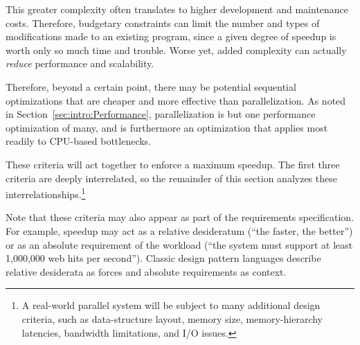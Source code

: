 \begin{description}
	This greater complexity often translates
	to higher development and maintenance costs.
	Therefore, budgetary constraints can
	limit the number and types of modifications made to
	an existing program, since a given degree of speedup is
	worth only so much time and trouble.
	Worse yet, added complexity can actually \emph{reduce}
	performance and scalability.

	Therefore, beyond a certain point,
	there may be potential sequential optimizations
	that are cheaper and more effective than parallelization.
	As noted in
	Section~\ref{sec:intro:Performance},
	parallelization is but one performance optimization of
	many, and is furthermore an optimization that applies
	most readily to CPU-based bottlenecks.
\end{description}
These criteria will act together to enforce a maximum speedup.
The first three criteria are deeply interrelated, so
the remainder of this section analyzes these
interrelationships.\footnote{
	A real-world parallel system will be subject to many additional
	design criteria, such as data-structure layout,
	memory size, memory-hierarchy latencies, bandwidth limitations,
	and I/O issues.}

Note that these criteria may also appear as part of the requirements
specification.
For example, speedup may act as a relative desideratum
(``the faster, the better'')
or as an absolute requirement of the workload (``the system
must support at least 1,000,000 web hits per second'').
Classic design pattern languages describe relative desiderata as forces
and absolute requirements as context.

